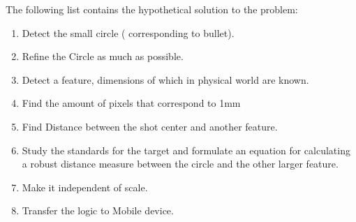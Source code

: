 \documentclass[10pt,twocolumn,letterpaper]{article}
\begin{document}
The following list contains the hypothetical solution to the problem:
\begin{enumerate}
\item Detect the small circle ( corresponding to bullet).​

\item Refine the Circle as much as possible.

\item Detect a feature, dimensions of which in physical world are known.
\item Find the amount of pixels that correspond to 1mm

\item Find Distance between the shot center and another feature.

\item Study the standards for the target and formulate an equation for calculating a robust distance measure between the circle and the other larger feature.

\item Make it independent of scale.​

\item Transfer the logic to Mobile device.
\end{enumerate}
\end{document}
